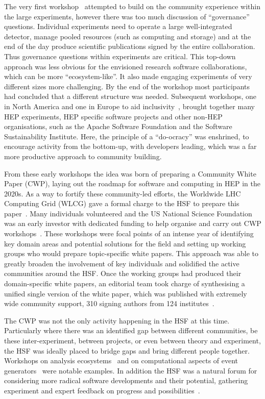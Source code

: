 \documentclass{article}
\begin{document}
The very first workshop~\cite{CERN-WS} attempted to build on the
community experience within the large experiments, however there was too
much discussion of ``governance'' questions. Individual experiments need
to operate a large well-integrated detector, manage pooled resources
(such as computing and storage) and at the end of the day produce
scientific publications signed by the entire collaboration. Thus
governance questions within experiments are critical. This top-down
approach was less obvious for the envisioned research software
collaborations, which can be more ``ecosystem-like''. It also made
engaging experiments of very different sizes more challenging. By the
end of the workshop most participants had concluded that a different
structure was needed. Subsequent workshops, one in North America and
one in Europe to aid inclusivity~\cite{SLAC-WS,LAL-WS}, brought together
many HEP experiments, HEP specific software projects and other non-HEP
organisations, such as the Apache Software Foundation and the Software
Sustainability Institute. Here, the principle of a ``do-ocracy'' was
enshrined, to encourage activity from the bottom-up, with developers
leading, which was a far more productive approach to community building.

From these early workshops the idea was born of preparing a Community
White Paper (CWP), laying out the roadmap for software and computing in
HEP in the 2020s. As a way to fortify these community-led efforts, the
Worldwide LHC Computing Grid (WLCG) gave a formal charge to the HSF to
prepare this paper~\cite{CWP-Charge}. Many individuals volunteered and
the US National Science Foundation was an early investor with dedicated
funding to help organise and carry out CWP workshops~\cite{SDSC-CWP,LAPP-CWP}. These workshops were focal points of an intense year of
identifying key domain areas and potential solutions for the field and
setting up working groups who would prepare topic-specific white papers.
This approach was able to greatly broaden the involvement of key
individuals and solidified the active communities around the HSF. Once
the working groups had produced their domain-specific white papers, an
editorial team took charge of synthesising a unified single version of
the white paper, which was published with extremely wide community
support, 310 signing authors from 124 institutes~\cite{Albrecht2019}.

The CWP was not the only activity happening in the HSF at this time.
Particularly where there was an identified gap between different
communities, be these inter-experiment, between projects, or even
between theory and experiment, the HSF was ideally placed to bridge gaps
and bring different people together. Workshops on analysis ecosystems~\cite{ANALYSIS-ECO} 
and on computational aspects of event generators~\cite{COMP-GEN} were notable examples. In addition the HSF was a natural
forum for considering more radical software developments and their
potential, gathering experiment and expert feedback on progress and
possibilities~\cite{GEANTV-RD}.
\end{document}
